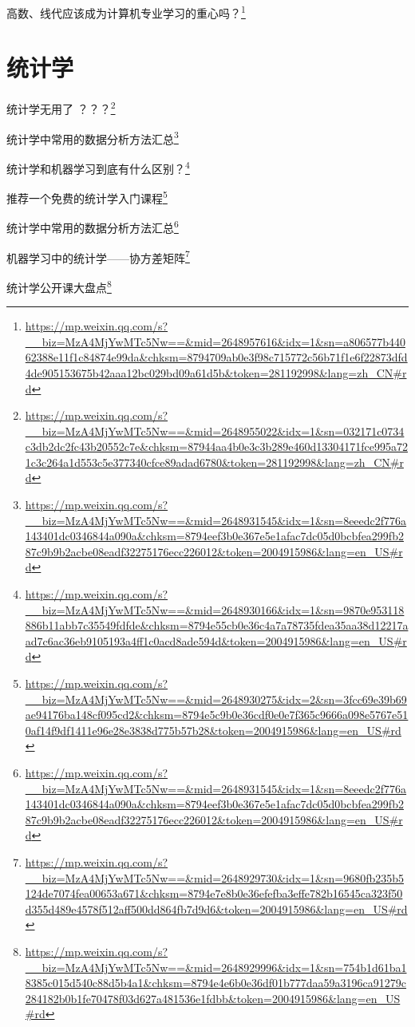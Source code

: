 \documentclass[]{ctexbook}
\renewcommand{\href}[2]{#2\footnote{\url{#1}}}
\begin{document}
\href{https://mp.weixin.qq.com/s?__biz=MzA4MjYwMTc5Nw==\&mid=2648957616\&idx=1\&sn=a806577b44062388e11f1c84874e99da\&chksm=8794709ab0e3f98c715772c56b71f1e6f22873dfd4de905153675b42aaa12bc029bd09a61d5b\&token=281192998\&lang=zh_CN\#rd}{高数、线代应该成为计算机专业学习的重心吗？}

\hypertarget{ux7edfux8ba1ux5b66}{%
\section{统计学}\label{ux7edfux8ba1ux5b66}}

\href{https://mp.weixin.qq.com/s?__biz=MzA4MjYwMTc5Nw==\&mid=2648955022\&idx=1\&sn=032171c0734c3db2dc2fc43b20552c7e\&chksm=87944aa4b0e3c3b289e460d13304171fce995a721c3c264a1d553c5e377340cfce89adad6780\&token=281192998\&lang=zh_CN\#rd}{统计学无用了 ？？？}

\href{https://mp.weixin.qq.com/s?__biz=MzA4MjYwMTc5Nw==\&mid=2648931545\&idx=1\&sn=8eeedc2f776a143401dc0346844a090a\&chksm=8794eef3b0e367e5e1afac7dc05d0bcbfea299fb287c9b9b2acbe08eadf32275176ecc226012\&token=2004915986\&lang=en_US\#rd}{统计学中常用的数据分析方法汇总}

\href{https://mp.weixin.qq.com/s?__biz=MzA4MjYwMTc5Nw==\&mid=2648930166\&idx=1\&sn=9870e953118886b11abb7c35549fdfde\&chksm=8794e55cb0e36c4a7a78735fdea35aa38d12217aad7c6ac36eb9105193a4ff1c0acd8ade594d\&token=2004915986\&lang=en_US\#rd}{统计学和机器学习到底有什么区别？}

\href{https://mp.weixin.qq.com/s?__biz=MzA4MjYwMTc5Nw==\&mid=2648930275\&idx=2\&sn=3fcc69e39b69ae94176ba148cf095cd2\&chksm=8794e5c9b0e36cdf0e0e7f365c9666a098e5767e510af14f9df1411e96e28e3838d775b57b28\&token=2004915986\&lang=en_US\#rd}{推荐一个免费的统计学入门课程}

\href{https://mp.weixin.qq.com/s?__biz=MzA4MjYwMTc5Nw==\&mid=2648931545\&idx=1\&sn=8eeedc2f776a143401dc0346844a090a\&chksm=8794eef3b0e367e5e1afac7dc05d0bcbfea299fb287c9b9b2acbe08eadf32275176ecc226012\&token=2004915986\&lang=en_US\#rd}{统计学中常用的数据分析方法汇总}

\href{https://mp.weixin.qq.com/s?__biz=MzA4MjYwMTc5Nw==\&mid=2648929730\&idx=1\&sn=9680fb235b5124de7074fea00653a671\&chksm=8794e7e8b0e36efefba3effe782b16545ca323f50d355d489e4578f512aff500dd864fb7d9d6\&token=2004915986\&lang=en_US\#rd}{机器学习中的统计学------协方差矩阵}

\href{https://mp.weixin.qq.com/s?__biz=MzA4MjYwMTc5Nw==\&mid=2648929996\&idx=1\&sn=754b1d61ba18385c015d540c88d5b4a1\&chksm=8794e4e6b0e36df01b777daa59a3196ca91279c284182b0b1fe70478f03d627a481536e1fdbb\&token=2004915986\&lang=en_US\#rd}{统计学公开课大盘点}
\end{document}
